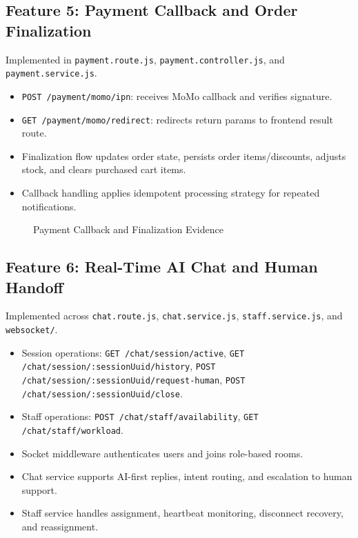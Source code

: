 \subsection{Feature 5: Payment Callback and Order Finalization}

Implemented in \texttt{payment.route.js}, \texttt{payment.controller.js}, and \texttt{payment.service.js}.
\begin{itemize}
    \item \texttt{POST /payment/momo/ipn}: receives MoMo callback and verifies signature.
    \item \texttt{GET /payment/momo/redirect}: redirects return params to frontend result route.
    \item Finalization flow updates order state, persists order items/discounts, adjusts stock, and clears purchased cart items.
    \item Callback handling applies idempotent processing strategy for repeated notifications.
\end{itemize}

\begin{figure}[H]
\centering
{}
\caption{Payment Callback and Finalization Evidence}
\label{fig:impl-payment-evidence}
\end{figure}

\subsection{Feature 6: Real-Time AI Chat and Human Handoff}

Implemented across \texttt{chat.route.js}, \texttt{chat.service.js}, \texttt{staff.service.js}, and \texttt{websocket/}.
\begin{itemize}
    \item Session operations:
    \texttt{GET /chat/session/active},
    \texttt{GET /chat/session/:sessionUuid/history},
    \texttt{POST /chat/session/:sessionUuid/request-human},
    \texttt{POST /chat/session/:sessionUuid/close}.
    \item Staff operations:
    \texttt{POST /chat/staff/availability},
    \texttt{GET /chat/staff/workload}.
    \item Socket middleware authenticates users and joins role-based rooms.
    \item Chat service supports AI-first replies, intent routing, and escalation to human support.
    \item Staff service handles assignment, heartbeat monitoring, disconnect recovery, and reassignment.
\end{itemize}

